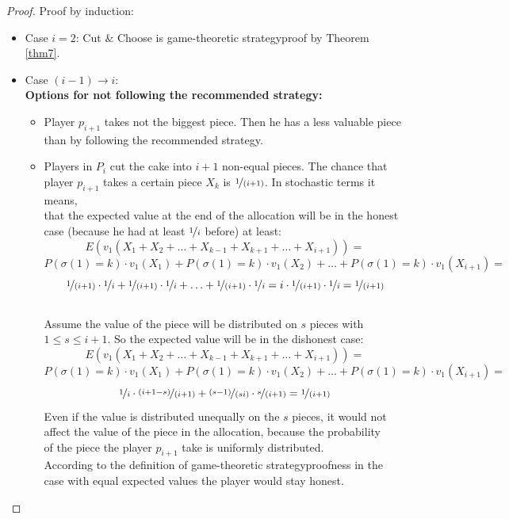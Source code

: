 \begin{proof} Proof by induction:
\textcolor{white}{x}
\begin{itemize} \item{Case} $i=2$: Cut $\&$ Choose is game-theoretic strategyproof by Theorem \ref{thm7}.\\
\item{Case} $(i-1) \rightarrow i$:\\ 
\newline
\textbf{Options for not following the recommended strategy:}\\
\begin{itemize}
\item Player $p_{i+1}$ takes not the biggest piece. Then he has a less valuable piece\\than by following the recommended strategy. 
\item Players in $P_i$ cut the cake into $i+1$ non-equal pieces. The chance that\\player $p_{i+1}$ takes a certain piece $X_k$ is $\nicefrac{1}{(i+1)}$. In stochastic terms it means,\\that the expected value at the end of the allocation will be in the honest\\case (because he had at least $\nicefrac{1}{i}$ before) at least: 
$$ E(v_1(X_1+X_2+\ldots+X_{k-1}+X_{k+1}+\ldots+X_{i+1}))=$$
$$P(\sigma(1)=k)\cdot v_1(X_1)+P(\sigma(1)=k)\cdot v_1(X_2)+\ldots+P(\sigma(1)=k)\cdot v_1(X_{i+1})=$$
$$\nicefrac{1}{(i+1)}\cdot \nicefrac{1}{i}+\nicefrac{1}{(i+1)}\cdot \nicefrac{1}{i} + \ldots +\nicefrac{1}{(i+1)}\cdot \nicefrac{1}{i}=i\cdot\nicefrac{1}{(i+1)}\cdot \nicefrac{1}{i}=\nicefrac{1}{(i+1)}$$
\\Assume the value of the piece will be distributed on $s$ pieces with\\$1 \leq s \leq i+1$. So the expected value will be in the dishonest case:  $$E(v_1(X_1+X_2+\ldots+X_{k-1}+X_{k+1}+\ldots+X_{i+1}))=$$$$P(\sigma(1)=k)\cdot v_1(X_1)+P(\sigma(1)=k)\cdot v_1(X_2)+\ldots+P(\sigma(1)=k)\cdot v_1(X_{i+1})=$$$$ \nicefrac{1}{i} \cdot \nicefrac{(i+1-s)}{(i+1)} + \nicefrac{(s-1)}{(si)}\cdot \nicefrac{s}{(i+1)} =\nicefrac{1}{(i+1)} $$ 
Even if the value is distributed unequally on the $s$ pieces, it would not\\affect the value of the piece in the allocation, because the probability\\of the piece the player $p_{i+1}$ take is uniformly distributed.\\
According to the definition of game-theoretic strategyproofness in the\\case with equal expected values the player would stay honest.
\end{itemize}
\end{itemize}
\end{proof}
